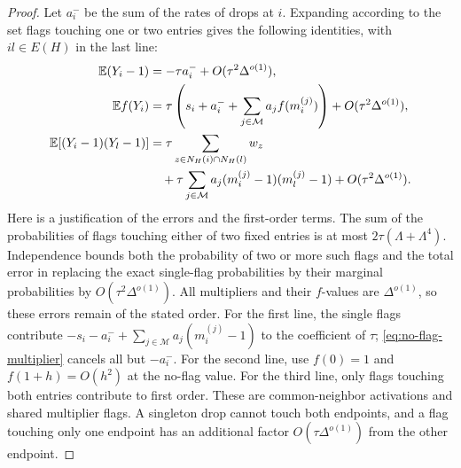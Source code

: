 \begin{proof}
Let $a_i^-$ be the sum of the rates of drops at $i$.  Expanding according
to the set flags touching one or two entries gives the following
identities, with $il\in E(H)$ in the last line:
\begin{equation}\label{eq:multiplier-moments}
 \begin{aligned}
 \mathbb E(Y_i-1)
   &=-\tau a_i^-+O(\tau^2\Delta^{o(1)}),\\
 \mathbb E f(Y_i)
   &=\tau\left(s_i+a_i^-+
           \sum_{j\in\mathcal M}a_jf(m_i^{(j)})\right)
       +O(\tau^2\Delta^{o(1)}),\\
 \mathbb E[(Y_i-1)(Y_l-1)]
   &=\tau\sum_{z\in N_H(i)\cap N_H(l)}w_z\\
   &\quad+\tau\sum_{j\in\mathcal M}
          a_j(m_i^{(j)}-1)(m_l^{(j)}-1)
       +O(\tau^2\Delta^{o(1)}).
 \end{aligned}
\end{equation}
Here is a justification of the errors and the first-order terms.
The sum of the probabilities of flags touching either of two fixed
entries is at most $2\tau(\Lambda+\Lambda^4)$.  Independence bounds
both the probability of two or more such flags and the total error in
replacing the exact single-flag probabilities by their marginal probabilities by
$O(\tau^2\Delta^{o(1)})$.  All multipliers and their $f$-values are
$\Delta^{o(1)}$, so these errors remain of the stated order.
For the first line, the single flags contribute
$-s_i-a_i^-+\sum_{j\in\mathcal M}a_j(m_i^{(j)}-1)$ to the coefficient
of $\tau$; \eqref{eq:no-flag-multiplier} cancels all but $-a_i^-$.
For the second line, use $f(0)=1$ and $f(1+h)=O(h^2)$ at the no-flag
value.  For the third line, only flags touching both entries contribute
to first order.  These are common-neighbor activations and shared
multiplier flags.  A singleton drop cannot touch both endpoints, and
a flag touching only one endpoint has an additional factor
$O(\tau\Delta^{o(1)})$ from the other endpoint.


\end{proof}

